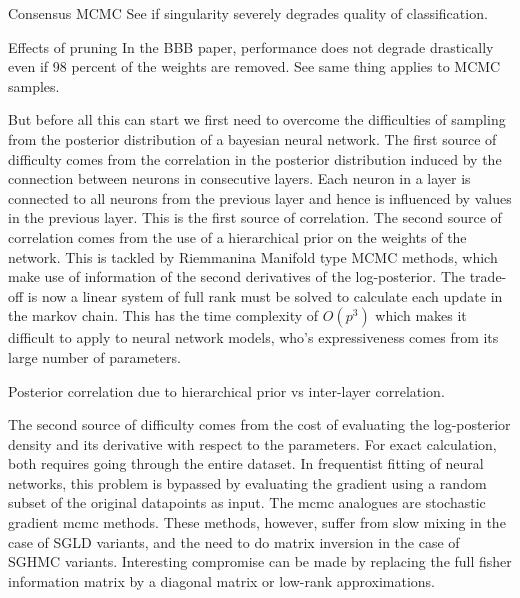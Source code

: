 \documentclass{book}
\begin{document}
\begin{enumerate}
Consensus MCMC 
See if singularity severely degrades quality of classification.

Effects of pruning
In the BBB paper, performance does not degrade drastically even if 98 percent of
the weights are removed. See same thing applies to MCMC samples. 





But before all this can start we first need to overcome the difficulties of
sampling from the posterior distribution of a bayesian neural network. The
first source of difficulty comes from the correlation in the posterior distribution induced by
the connection between neurons in consecutive layers. Each neuron in a layer is
connected to all neurons from the previous layer and hence is influenced by
values in the previous layer. This is the first source of correlation. The
second source of correlation comes from the use of a hierarchical prior on the
weights of the network. This is tackled by Riemmanina Manifold type MCMC
methods, which make use of information of the second derivatives of the
log-posterior. The trade-off is now a linear system of full rank must be solved
to calculate each update in the markov chain. This has the time complexity of
$O(p^3)$ which makes it difficult to apply to neural network models, who's
expressiveness comes from its large number of parameters. 

Posterior correlation due to hierarchical prior vs inter-layer correlation. 

The second source of difficulty comes from the cost of evaluating the
log-posterior density and its derivative with respect to the parameters. For
exact calculation, both requires going through the entire dataset. In
frequentist fitting of neural networks, this problem is bypassed by evaluating
the gradient using a random subset of the original datapoints as input. The mcmc
analogues are stochastic gradient mcmc methods. These methods, however, suffer
from slow mixing in the case of SGLD variants, and the need to do matrix
inversion in the case of SGHMC variants. Interesting compromise can be made by
replacing the full fisher information matrix by a diagonal matrix or low-rank
approximations. 


\end{enumerate}
\end{document}
